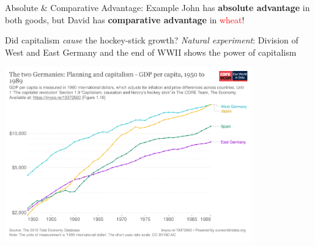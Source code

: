 \documentclass[11pt,aspectratio=43,usenames,dvipsnames]{beamer}
\newcommand{\red}[1]{\textcolor{red}{#1}}
\theoremstyle{definition}
\begin{document}
\begin{frame}{Absolute \& Comparative Advantage: Example}
    John has \textbf{absolute advantage} in both goods, but David has \textbf{comparative advantage} in \red{wheat}!


\end{frame}


\begin{frame}{Did capitalism \textit{cause} the hockey-stick growth?}
\label{slide:Did_capitalism__textit_cause__the_hockey_stick_growth_}
\textit{Natural experiment}: Division of West and East Germany and the end of WWII shows the power of capitalism \href{https://tinyco.re/19372660}{}

    \begin{center}
        \includegraphics[width=0.8\textwidth]{./figures/the-two-germanies-planning-and-capitalism.png}
    \end{center}
\end{frame}
\end{document}
